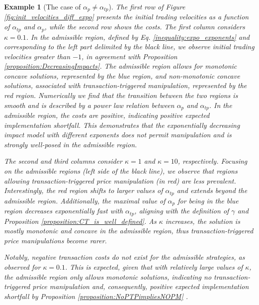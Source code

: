 \documentclass[final,3p,authoryear,12pt]{elsarticle}
\newtheorem{example}{Example}
\begin{document}
\begin{example}[The case of $\alpha_{p}\neq \alpha_{tp}$]
The first row of Figure \ref{fig:init_velocities_diff_expo} presents the initial trading velocities as a function of $\alpha_{tp}$ and $\alpha_{p}$, while the second row shows the costs. The first column considers $\kappa=0.1$. In the admissible region, defined by Eq. \eqref{inequality:expo_exponents} and corresponding to the left part delimited by the black line, we observe initial trading velocities greater than $-1$, in agreement with Proposition \ref{proposition:DecreasingImpacts}. The admissible region allows for monotonic concave solutions, represented by the blue region, and non-monotonic concave solutions, associated with transaction-triggered manipulation, represented by the red region. Numerically we find that the transition between the two regions is smooth and is described by a power law relation between $\alpha_{p}$ and $\alpha_{tp}$. %
In the admissible region, the costs are positive, indicating positive expected implementation shortfall. This demonstrates that the exponentially decreasing impact model with different exponents does not permit manipulation and is strongly well-posed in the admissible region.

The second and third columns consider $\kappa=1$ and $\kappa=10$, respectively. Focusing on the admissible regions (left side of the black line), we observe that regions allowing transaction-triggered price manipulation (in red) are less prevalent. Interestingly, the red region shifts to larger values of $\alpha_{tp}$ and extends beyond the admissible region. Additionally, the maximal value of $\alpha_{p}$ for being in the blue region decreases exponentially fast with $\alpha_{tp}$, aligning with the definition of $\gamma$ and Proposition \ref{proposition:CT_is_well_defined}. As $\kappa$ increases, the solution is mostly monotonic and concave in the admissible region, thus transaction-triggered price manipulations become rarer.  %

Notably, negative transaction costs do not exist for the admissible strategies, as observed for $\kappa=0.1$. This is expected, given that with relatively large values of $\kappa$, the admissible region only allows monotonic solutions, indicating no transaction-triggered price manipulation and, consequently, positive expected implementation shortfall by Proposition \ref{proposition:NoPTPimpliesNOPM} \cite{alfonsi2010optimal}.


\end{example}
\end{document}
